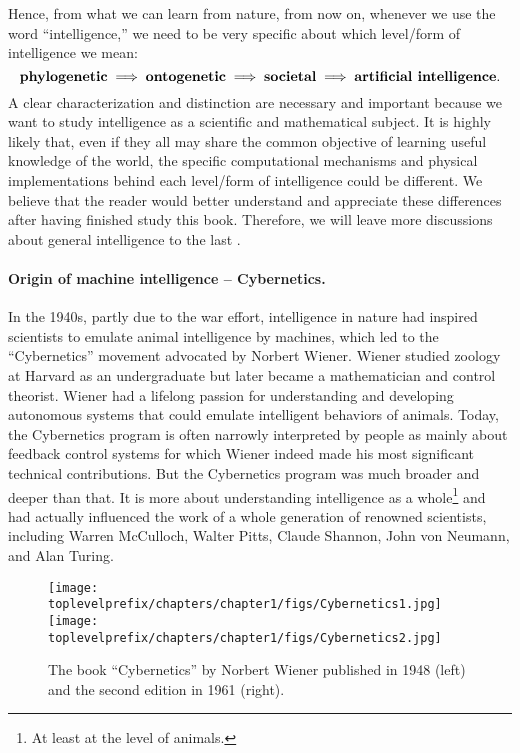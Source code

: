\documentclass[../../book-main.tex]{subfiles}
\begin{document}
Hence, from what we can learn from nature, from now on, whenever we use the word ``intelligence,'' we need to be very specific about which level/form of intelligence we mean:
\begin{equation}
\mbox{\textbf{phylogenetic}} \;
   \Longrightarrow \; \mbox{\textbf{ontogenetic}} \; \Longrightarrow \; 
   \mbox{\textbf{societal}}
   \; \Longrightarrow \; 
   \mbox{\textbf{artificial intelligence}}.
\end{equation}
A clear characterization and distinction are necessary and important because we want to study intelligence as a scientific and mathematical subject. It is highly likely that, even if they all may share the common objective of learning useful knowledge of the world, the specific computational mechanisms and physical implementations behind each level/form of intelligence could be different. We believe that the reader would better understand and appreciate these differences after having finished study this book. Therefore, we will leave more discussions about general intelligence to the last .





\paragraph{Origin of machine intelligence -- Cybernetics.}
In the 1940s, partly due to the war effort, intelligence in nature had inspired scientists to emulate animal intelligence by machines, which led to the ``Cybernetics'' movement advocated by Norbert Wiener. Wiener studied zoology at Harvard as an undergraduate but later became a mathematician and control theorist. Wiener had a lifelong passion for understanding and developing autonomous systems that could emulate intelligent behaviors of animals. Today, the Cybernetics program is often narrowly interpreted by people as mainly about feedback control systems for which Wiener indeed made his most significant technical contributions. But the Cybernetics program was much broader and deeper than that. It is more about understanding intelligence as a whole\footnote{At least at the level of animals.} and had actually influenced the work of a whole generation of renowned scientists, including Warren McCulloch, Walter Pitts, Claude Shannon, John von Neumann, and Alan Turing.  

\begin{figure}
    \centering
    \texttt{[image: \\toplevelprefix/chapters/chapter1/figs/Cybernetics1.jpg]}
    \hspace{10mm} \texttt{[image: \\toplevelprefix/chapters/chapter1/figs/Cybernetics2.jpg]}
    \caption{The book ``Cybernetics'' by Norbert Wiener published in 1948 \cite{Wiener-Cybernetics-1948} (left) and the second edition in 1961 \cite{Wiener-Cybernetics-1961} (right).}
    \label{fig:cybernetcis}
\end{figure}
\end{document}
